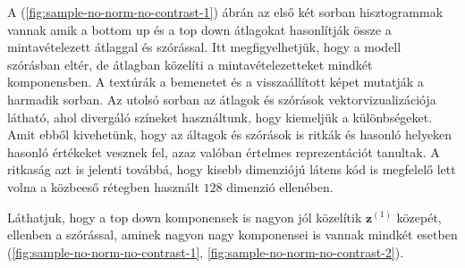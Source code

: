 \documentclass[12pt, english]{article}
\begin{document}
\par A (\ref{fig:sample-no-norm-no-contrast-1}) ábrán az első két sorban hisztogrammak vannak amik a bottom up és a top down átlagokat hasonlítják össze a mintavételezett átlaggal és szórással. Itt megfigyelhetjük, hogy a modell szórásban eltér, de átlagban közelíti a mintavételezetteket mindkét komponensben. A textúrák a bemenetet és a visszaállított képet mutatják a harmadik sorban. Az utolsó sorban az átlagok és szórások vektorvizualizációja látható, ahol divergáló színeket használtunk, hogy kiemeljük a különbségeket. Amit ebből kivehetünk, hogy az áltagok és szórások is ritkák és hasonló helyeken hasonló értékeket vesznek fel, azaz valóban értelmes reprezentációt tanultak. A ritkaság azt is jelenti továbbá, hogy kisebb dimenziójú látens kód is megfelelő lett volna a közbeeső rétegben használt $128$ dimenzió ellenében.

\vspace{4mm}

\par Láthatjuk, hogy a top down komponensek is nagyon jól közelítik $\bm{z}^{(1)}$ közepét, ellenben a szórással, aminek nagyon nagy komponensei is vannak mindkét esetben (\ref{fig:sample-no-norm-no-contrast-1}, \ref{fig:sample-no-norm-no-contrast-2}).

\vspace{4mm}
\end{document}
